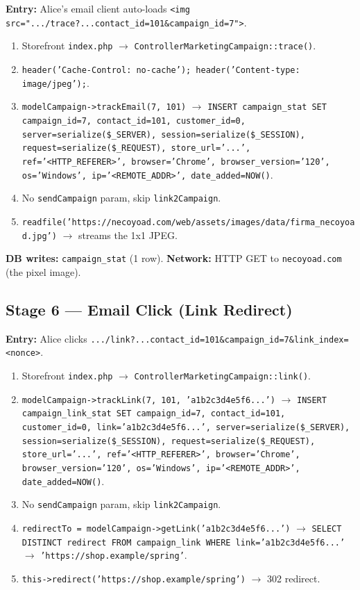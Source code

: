 \documentclass[11pt,a4paper]{article}
\begin{document}
\textbf{Entry:} Alice's email client auto-loads
\texttt{<img src=".../trace?...contact\_id=101\&campaign\_id=7">}.

\begin{enumerate}[leftmargin=1.6em,itemsep=2pt]
  \item Storefront \texttt{index.php} $\to$
        \texttt{ControllerMarketingCampaign::trace()}.
  \item \texttt{header('Cache-Control: no-cache');
        header('Content-type: image/jpeg');}.
  \item \texttt{modelCampaign->trackEmail(7, 101)} $\to$
        \texttt{INSERT campaign\_stat SET campaign\_id=7,
        contact\_id=101, customer\_id=0, server=serialize(\$\_SERVER),
        session=serialize(\$\_SESSION),
        request=serialize(\$\_REQUEST), store\_url='...',
        ref='<HTTP\_REFERER>', browser='Chrome',
        browser\_version='120', os='Windows', ip='<REMOTE\_ADDR>',
        date\_added=NOW()}.
  \item No \texttt{sendCampaign} param, skip
        \texttt{link2Campaign}.
  \item \texttt{readfile('https://necoyoad.com/web/assets/images/data/firma\_necoyoad.jpg')}
        $\to$ streams the 1x1 JPEG.
\end{enumerate}

\textbf{DB writes:} \texttt{campaign\_stat} (1 row).
\textbf{Network:} HTTP GET to \texttt{necoyoad.com} (the pixel
image).

\subsection{Stage 6 --- Email Click (Link Redirect)}

\textbf{Entry:} Alice clicks
\texttt{.../link?...contact\_id=101\&campaign\_id=7\&link\_index=<nonce>}.

\begin{enumerate}[leftmargin=1.6em,itemsep=2pt]
  \item Storefront \texttt{index.php} $\to$
        \texttt{ControllerMarketingCampaign::link()}.
  \item \texttt{modelCampaign->trackLink(7, 101, 'a1b2c3d4e5f6...')}
        $\to$ \texttt{INSERT campaign\_link\_stat SET
        campaign\_id=7, contact\_id=101, customer\_id=0,
        link='a1b2c3d4e5f6...', server=serialize(\$\_SERVER),
        session=serialize(\$\_SESSION),
        request=serialize(\$\_REQUEST), store\_url='...',
        ref='<HTTP\_REFERER>', browser='Chrome',
        browser\_version='120', os='Windows', ip='<REMOTE\_ADDR>',
        date\_added=NOW()}.
  \item No \texttt{sendCampaign} param, skip
        \texttt{link2Campaign}.
  \item \texttt{redirectTo = modelCampaign->getLink('a1b2c3d4e5f6...')}
        $\to$ \texttt{SELECT DISTINCT redirect FROM campaign\_link
        WHERE link='a1b2c3d4e5f6...'} $\to$
        \texttt{'https://shop.example/spring'}.
  \item \texttt{this->redirect('https://shop.example/spring')}
        $\to$ 302 redirect.
\end{enumerate}
\end{document}
